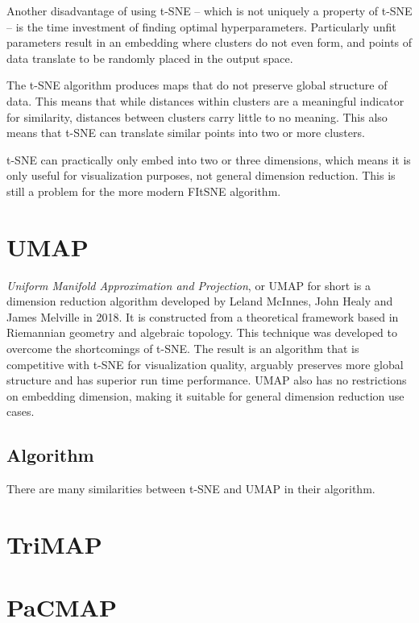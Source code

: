 Another disadvantage of using t-SNE -- which is not uniquely a property of t-SNE -- is the time investment of finding optimal hyperparameters. Particularly unfit parameters result in an embedding where clusters do not even form, and points of data translate to be randomly placed in the output space.\cite{bib:distill}

The t-SNE algorithm produces maps that do not preserve global structure of data. This means that while distances within clusters are a meaningful indicator for similarity, distances between clusters carry little to no meaning. This also means that t-SNE can translate similar points into two or more clusters.

t-SNE can practically only embed into two or three dimensions, which means it is only useful for visualization purposes, not general dimension reduction. This is still a problem for the more modern FItSNE algorithm.

\section{UMAP}\label{sec:umap}

\textit{Uniform Manifold Approximation and Projection}\cite{bib:umap}, or UMAP for short is a dimension reduction algorithm developed by Leland McInnes, John Healy and James Melville in 2018. It is constructed from a theoretical framework based in Riemannian geometry and algebraic topology. This technique was developed to overcome the shortcomings of t-SNE. The result is an algorithm that is competitive with t-SNE for visualization quality, arguably preserves more global structure and has superior run time performance. UMAP also has no restrictions on embedding dimension, making it suitable for general dimension reduction use cases.

\subsection{Algorithm}

There are many similarities between t-SNE and UMAP in their algorithm.


\section{TriMAP}\label{sec:trimap}



\section{PaCMAP}\label{sec:pacmap}



